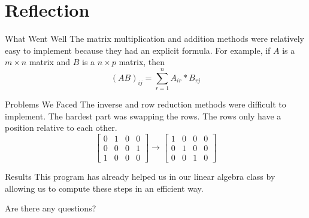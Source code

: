 \documentclass{beamer}
\begin{document}
\section{Reflection}
\begin{frame}{What Went Well}
    The matrix multiplication and addition methods were relatively easy to implement because they had an explicit formula. For example, if \(A\) is a \(m \times n\) matrix and \(B\) is a \(n \times p\) matrix, then
    \begin{equation}
        (AB)_{ij} = \sum^{n}_{r=1}A_{ir}*B_{rj}
    \end{equation}
\end{frame}

\begin{frame}{Problems We Faced}
    The inverse and row reduction methods were difficult to implement. The hardest part was swapping the rows. The rows only have a position relative to each other. 
    \begin{equation*}
    \left[
        \begin{array}{cccc}
            0 & 1&0&0  \\
            0 & 0&0&1 \\
            1&0&0&0
        \end{array}
    \right]
    \rightarrow
    \left[
    \begin{array}{cccc}
        1 &0&0&0  \\
         0&1&0&0\\
         0&0&1&0
    \end{array}
    \right]
    \end{equation*}
\end{frame}

\begin{frame}{Results}
    This program has already helped us in our linear algebra class by allowing us to compute these steps in an efficient way. \pause
\begin{center}
    Are there any questions?
\end{center}
    
\end{frame}
\end{document}
